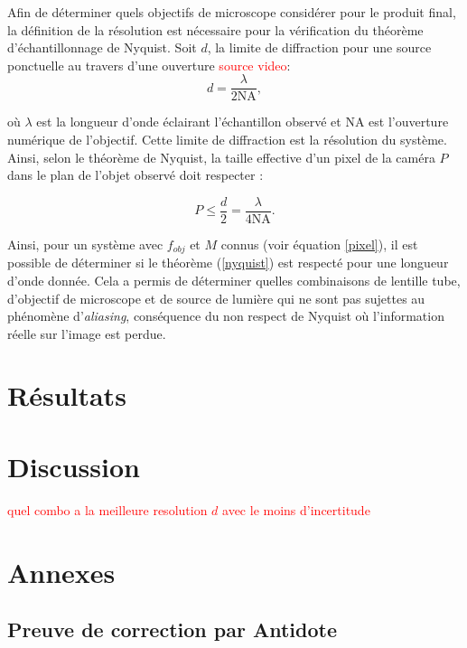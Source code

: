 \documentclass[conference]{IEEEtran}
\begin{document}
Afin de déterminer quels objectifs de microscope considérer pour le produit final, la définition
de la résolution est nécessaire pour la vérification du théorème d'échantillonnage de Nyquist. Soit $d$,
la limite de diffraction pour une source ponctuelle au travers d'une ouverture \textcolor{red}{source video}:
\begin{equation}
  d = \frac{\lambda}{2 \text{NA}},
\end{equation}

où $\lambda$ est la longueur d'onde éclairant l'échantillon observé et NA est l'ouverture numérique de
l'objectif. Cette limite de diffraction est la résolution du système. Ainsi, selon le théorème
de Nyquist, la taille effective d'un pixel de la caméra $P$ dans le plan de l'objet observé doit respecter :

\begin{equation}\label{nyquist}
  P \leq \frac{d}{2} = \frac{\lambda}{4 \text{NA} }.
\end{equation}


Ainsi, pour un système avec $f_{obj}$ et $M$ connus (voir équation \ref{pixel}), il est possible de déterminer si le théorème 
(\ref{nyquist}) est respecté pour une longueur d'onde donnée. Cela a permis de déterminer quelles 
combinaisons de lentille tube, d'objectif de microscope et de source de lumière qui ne sont pas 
sujettes au phénomène d'\textit{aliasing}, conséquence du non respect de Nyquist où l'information
réelle sur l'image est perdue.


\section{Résultats \label{resultats}}



\section{Discussion}

\textcolor{red}{quel combo a la meilleure resolution $d$ avec le moins d'incertitude}


\clearpage

\section{Annexes}

\subsection{Preuve de correction par Antidote}

\clearpage
\end{document}
